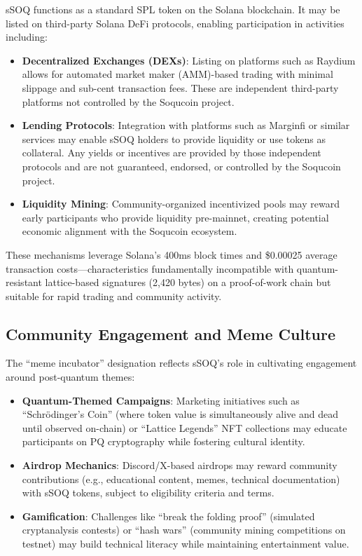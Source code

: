 \documentclass[10pt]{article}
\begin{document}
sSOQ functions as a standard SPL token on the Solana blockchain. It may be listed on third-party Solana DeFi protocols, enabling participation in activities including:

\begin{itemize}
    \item \textbf{Decentralized Exchanges (DEXs)}: Listing on platforms such as Raydium allows for automated market maker (AMM)-based trading with minimal slippage and sub-cent transaction fees. These are independent third-party platforms not controlled by the Soqucoin project.
    \item \textbf{Lending Protocols}: Integration with platforms such as Marginfi or similar services may enable sSOQ holders to provide liquidity or use tokens as collateral. Any yields or incentives are provided by those independent protocols and are not guaranteed, endorsed, or controlled by the Soqucoin project.
    \item \textbf{Liquidity Mining}: Community-organized incentivized pools may reward early participants who provide liquidity pre-mainnet, creating potential economic alignment with the Soqucoin ecosystem.
\end{itemize}

These mechanisms leverage Solana's 400ms block times and \$0.00025 average transaction costs—characteristics fundamentally incompatible with quantum-resistant lattice-based signatures (2,420 bytes) on a proof-of-work chain but suitable for rapid trading and community activity.

\subsection{Community Engagement and Meme Culture}

The ``meme incubator'' designation reflects sSOQ's role in cultivating engagement around post-quantum themes:

\begin{itemize}
    \item \textbf{Quantum-Themed Campaigns}: Marketing initiatives such as ``Schrödinger's Coin'' (where token value is simultaneously alive and dead until observed on-chain) or ``Lattice Legends'' NFT collections may educate participants on PQ cryptography while fostering cultural identity.
    \item \textbf{Airdrop Mechanics}: Discord/X-based airdrops may reward community contributions (e.g., educational content, memes, technical documentation) with sSOQ tokens, subject to eligibility criteria and terms.
    \item \textbf{Gamification}: Challenges like ``break the folding proof'' (simulated cryptanalysis contests) or ``hash wars'' (community mining competitions on testnet) may build technical literacy while maintaining entertainment value.
\end{itemize}
\end{document}

